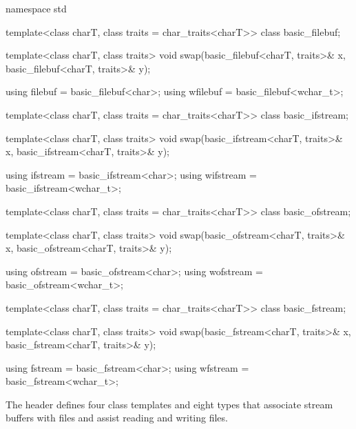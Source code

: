 %
%
%
%
%
%
%
%
%
%
%
%
%
%
%
%
%
\begin{codeblock}
namespace std {
  template<class charT, class traits = char_traits<charT>>
    class basic_filebuf;

  template<class charT, class traits>
    void swap(basic_filebuf<charT, traits>& x, basic_filebuf<charT, traits>& y);

  using filebuf  = basic_filebuf<char>;
  using wfilebuf = basic_filebuf<wchar_t>;

  template<class charT, class traits = char_traits<charT>>
    class basic_ifstream;

  template<class charT, class traits>
    void swap(basic_ifstream<charT, traits>& x, basic_ifstream<charT, traits>& y);

  using ifstream  = basic_ifstream<char>;
  using wifstream = basic_ifstream<wchar_t>;

  template<class charT, class traits = char_traits<charT>>
    class basic_ofstream;

  template<class charT, class traits>
    void swap(basic_ofstream<charT, traits>& x, basic_ofstream<charT, traits>& y);

  using ofstream  = basic_ofstream<char>;
  using wofstream = basic_ofstream<wchar_t>;

  template<class charT, class traits = char_traits<charT>>
    class basic_fstream;

  template<class charT, class traits>
    void swap(basic_fstream<charT, traits>& x, basic_fstream<charT, traits>& y);

  using fstream  = basic_fstream<char>;
  using wfstream = basic_fstream<wchar_t>;
}
\end{codeblock}

\pnum
The header 
defines four class templates and eight types
that associate stream buffers with files and assist
reading and writing files.

